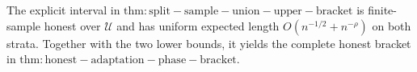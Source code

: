 The explicit interval in \(\mathrm{thm:split-sample-union-upper-bracket}\) is finite-sample honest over \(\mathcal U\) and has uniform expected length \(O(n^{-1/2}+n^{-\rho})\) on both strata. Together with the two lower bounds, it yields the complete honest bracket in \(\mathrm{thm:honest-adaptation-phase-bracket}\).
